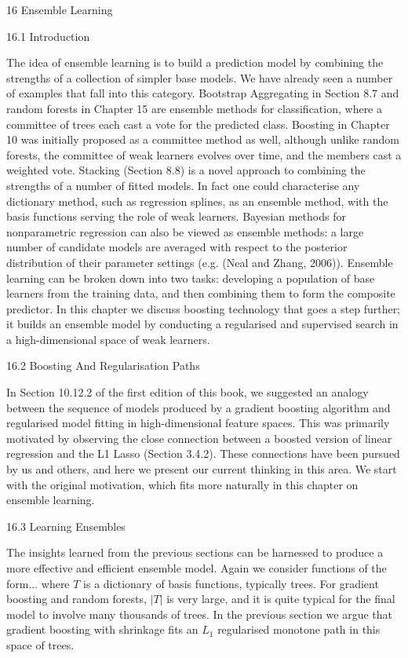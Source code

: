 16 Ensemble Learning

16.1 Introduction

The idea of ensemble learning is to build a prediction model by combining the strengths of a collection of simpler base models. We have already seen a number of examples that fall into this category. Bootstrap Aggregating in Section 8.7 and random forests in Chapter 15 are ensemble methods for classification, where a committee of trees each cast a vote for the predicted class. Boosting in Chapter 10 was initially proposed as a committee method as well, although unlike random forests, the committee of weak learners evolves over time, and the members cast a weighted vote. Stacking (Section 8.8) is a novel approach to combining the strengths of a number of fitted models. In fact one could characterise any dictionary method, such as regression splines, as an ensemble method, with the basis functions serving the role of weak learners. Bayesian methods for nonparametric regression can also be viewed as ensemble methods: a large number of candidate models are averaged with respect to the posterior distribution of their parameter settings (e.g. (Neal and Zhang, 2006)). Ensemble learning can be broken down into two tasks: developing a population of base learners from the training data, and then combining them to form the composite predictor. In this chapter we discuss boosting technology that goes a step further; it builds an ensemble model by conducting a regularised and supervised search in a high-dimensional space of weak learners.

16.2 Boosting And Regularisation Paths

In Section 10.12.2 of the first edition of this book, we suggested an analogy between the sequence of models produced by a gradient boosting algorithm and regularised model fitting in high-dimensional feature spaces. This was primarily motivated by observing the close connection between a boosted version of linear regression and the L1 Lasso (Section 3.4.2). These connections have been pursued by us and others, and here we present our current thinking in this area. We start with the original motivation, which fits more naturally in this chapter on ensemble learning.

16.3 Learning Ensembles

The insights learned from the previous sections can be harnessed to produce a more effective and efficient ensemble model. Again we consider functions of the form... where $T$ is a dictionary of basis functions, typically trees. For gradient boosting and random forests, $|T|$ is very large, and it is quite typical for the final model to involve many thousands of trees. In the previous section we argue that gradient boosting with shrinkage fits an $L_1$ regularised monotone path in this space of trees.

